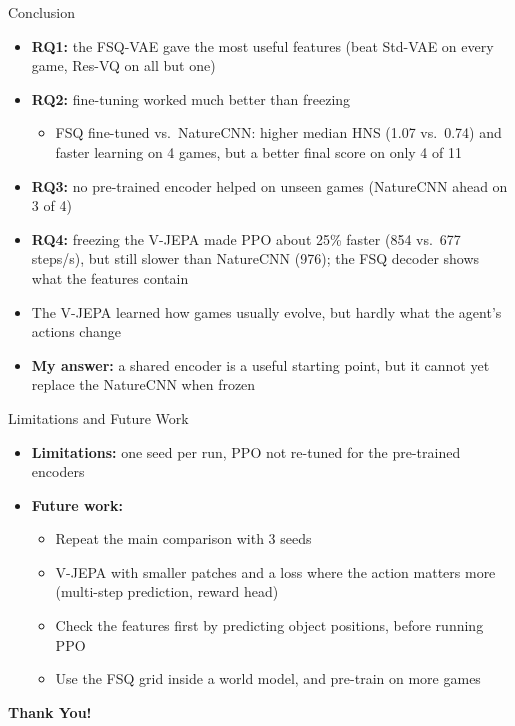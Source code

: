 \documentclass[aspectratio=43,10pt]{beamer}
\begin{document}
\begin{frame}{Conclusion}
  \begin{itemize}\setlength\itemsep{0.55em}
    \item \textbf{RQ1:} the FSQ-VAE gave the most useful features (beat Std-VAE on every game,
          Res-VQ on all but one)
    \item \textbf{RQ2:} fine-tuning worked much better than freezing
      \begin{itemize}
        \item FSQ fine-tuned vs.\ NatureCNN: higher median HNS (1.07 vs.\ 0.74) and faster
              learning on 4 games, but a better final score on only 4 of 11
      \end{itemize}
    \item \textbf{RQ3:} no pre-trained encoder helped on unseen games (NatureCNN ahead on 3 of 4)
    \item \textbf{RQ4:} freezing the V-JEPA made PPO about 25\% faster (854 vs.\ 677 steps/s),
          but still slower than NatureCNN (976); the FSQ decoder shows what the features contain
    \item The V-JEPA learned how games usually evolve, but hardly what the agent's actions change
    \item \textbf{My answer:} a shared encoder is a useful starting point, but it cannot yet
          replace the NatureCNN when frozen
  \end{itemize}
\end{frame}

\begin{frame}{Limitations and Future Work}
  \begin{itemize}\setlength\itemsep{0.55em}
    \item \textbf{Limitations:} one seed per run, PPO not re-tuned for the pre-trained encoders
    \item \textbf{Future work:}
      \begin{itemize}\setlength\itemsep{0.3em}
        \item Repeat the main comparison with 3 seeds
        \item V-JEPA with smaller patches and a loss where the action matters more
              (multi-step prediction, reward head)
        \item Check the features first by predicting object positions, before running PPO
        \item Use the FSQ grid inside a world model, and pre-train on more games
      \end{itemize}
  \end{itemize}
\end{frame}

\begin{frame}
  \vfill
  \centering
  {\Huge\bfseries Thank You!}
  \vfill
\end{frame}
\end{document}
